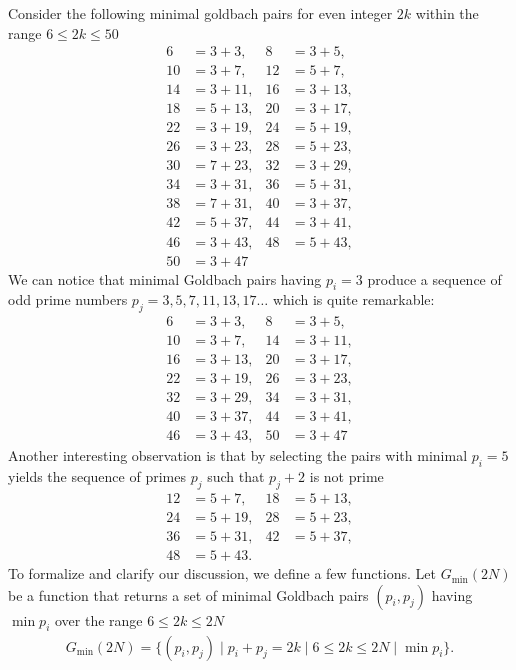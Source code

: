 Consider the following minimal goldbach pairs for even integer $2k$ within the range $6 \leq 2k \leq 50$
\begin{align*}
    6  &= 3 + 3,   & 8  &= 3 + 5,   \\
    10 &= 3 + 7,   & 12 &= 5 + 7,   \\
    14 &= 3 + 11,  & 16 &= 3 + 13,  \\
    18 &= 5 + 13,  & 20 &= 3 + 17,  \\
    22 &= 3 + 19,  & 24 &= 5 + 19,  \\
    26 &= 3 + 23,  & 28 &= 5 + 23,  \\
    30 &= 7 + 23,  & 32 &= 3 + 29,  \\
    34 &= 3 + 31,  & 36 &= 5 + 31,  \\
    38 &= 7 + 31,  & 40 &= 3 + 37,  \\
    42 &= 5 + 37,  & 44 &= 3 + 41,  \\
    46 &= 3 + 43,  & 48 &= 5 + 43,  \\
    50 &= 3 + 47
\end{align*}
We can notice that minimal Goldbach pairs having $p_i=3$ produce a sequence of odd prime numbers
$p_j = 3, 5, 7, 11, 13, 17 \dots$ which is quite remarkable:
\begin{align*}
    6  &= 3 + 3,   & 8  &= 3 + 5,   \\
    10 &= 3 + 7,   & 14 &= 3 + 11,  \\
    16 &= 3 + 13,  & 20 &= 3 + 17,  \\
    22 &= 3 + 19,  & 26 &= 3 + 23,  \\
    32 &= 3 + 29,  & 34 &= 3 + 31,  \\
    40 &= 3 + 37,  & 44 &= 3 + 41,  \\
    46 &= 3 + 43,  & 50 &= 3 + 47
\end{align*}
Another interesting observation is that by selecting the pairs with minimal $p_i=5$ yields
the sequence of primes $p_j$ such that $p_j+2$ is not prime
\begin{align*}
    12 &= 5 + 7,   & 18 &= 5 + 13,  \\
    24 &= 5 + 19,  & 28 &= 5 + 23,  \\
    36 &= 5 + 31,  & 42 &= 5 + 37,  \\
    48 &= 5 + 43.
\end{align*}
To formalize and clarify our discussion, we define a few functions.
Let $G_{\min} (2N)$ be a function that returns a set of minimal Goldbach pairs $(p_i, p_j)$ having $\min p_i$
over the range $6 \leq 2k \leq 2N$
\begin{align*}
    G_{\min} (2N) = \{(p_i, p_j) \mid p_i + p_j = 2k \mid 6 \leq 2k \leq 2N \mid \min p_i \}.
\end{align*}

